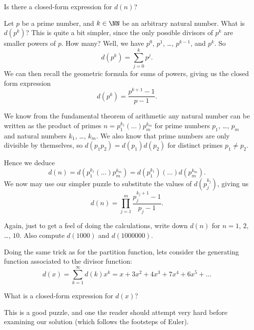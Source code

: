 \documentclass{article}
\begin{document}
Is there a closed-form expression for $d(n)$?

Let $p$ be a prime number, and $k\in\NN$ be an arbitrary natural
number. What is $d(p^{k})$? This is quite a bit simpler, since the only
possible divisors of $p^{k}$ are smaller powers of $p$. How many? Well,
we have $p^{0}$, $p^{1}$, \dots, $p^{k-1}$, and $p^{k}$. So
\begin{equation}
  d(p^{k}) = \sum^{k}_{j=0}p^{j}.
\end{equation}
We can then recall the geometric formula for sums of powers, giving us
the closed form expression
\begin{equation}
  d(p^{k}) = \frac{p^{k+1}-1}{p-1}.
\end{equation}

We know from the fundamental theorem of arithmetic any natural number
can be written as the product of primes $n = p_{1}^{k_{1}}(\dots)p_{m}^{k_{m}}$
for prime numbers $p_{1}$, \dots, $p_{m}$ and natural numbers $k_{1}$,
\dots, $k_{m}$. We also know that prime numbers are only divisible by
themselves, so $d(p_{1}p_{2})=d(p_{1})d(p_{2})$ for distinct primes
$p_{1}\neq p_{2}$.

Hence we deduce
\begin{equation}
  d(n) = d(p_{1}^{k_{1}}(\dots)p_{m}^{k_{m}}) = d(p_{1}^{k_{1}})(\dots)d(p_{m}^{k_{m}}).
\end{equation}
We now may use our simpler puzzle to substitute the values of
$d(p_{j}^{k_{j}})$, giving us
\begin{equation}
  d(n) = \prod^{m}_{j=1}\frac{p_{j}^{k_{j}+1}-1}{p_{j}-1}.
\end{equation}

 Again, just to get a feel of doing the calculations, write
down $d(n)$ for $n=1$, $2$, \dots, $10$. Also compute $d(1000)$ and
$d(1000000)$.

Doing the same trick as for the partition function, lets consider the
generating function associated to the divisor function:
\begin{equation}
d(x) = \sum^{\infty}_{k=1}d(k)x^{k} = x + 3x^{2} + 4x^{3} + 7x^{4} + 6x^{5} + \dots
\end{equation}

What is a closed-form expression for $d(x)$?

\M
This is a good puzzle, and one the reader should attempt very hard
before examining our solution (which follows the footsteps of Euler). 
\end{document}
